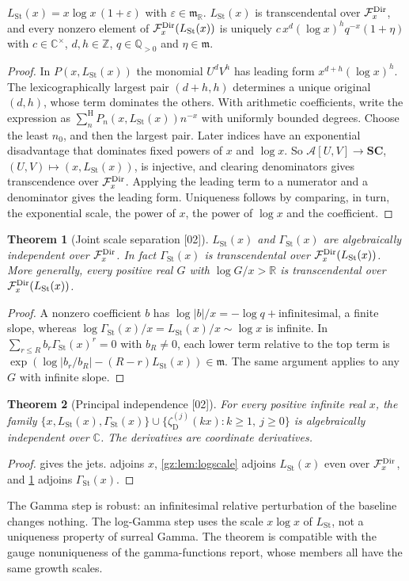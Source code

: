 \documentclass[11pt,a4paper]{article}
\numberwithin{equation}{section}
\newtheorem{theorem}{Theorem}[section]
\theoremstyle{definition}
\theoremstyle{remark}
\newcommand{\SC}{\mathbf{SC}}
\newcommand{\R}{\mathbb R}
\newcommand{\C}{\mathbb C}
\newcommand{\Q}{\mathbb Q}
\newcommand{\Z}{\mathbb Z}
\newcommand{\mm}{\mathfrak m}
\newcommand{\eps}{\varepsilon}
\newcommand{\Sh}{\mathop{\textstyle\sum}\nolimits^{\mathrm H}}
\newcommand{\LSt}{L_{\mathrm{St}}}
\newcommand{\GSt}{\Gamma_{\mathrm{St}}}
\newcommand{\zD}{\zeta_{\mathrm D}}
\newcommand{\Arith}{\mathcal A}
\newcommand{\src}[1]{\textup{[#1]}}
\begin{document}
\begin{lemma}[A logarithmic scale \src{02}]\label{gz:lem:logscale}
$\LSt(x)=x\log x\,(1+\eps)$ with $\eps\in\mm_\R$. $\LSt(x)$ is transcendental
over $\mathcal F_x^{\rm Dir}$, and every nonzero element of
$\mathcal F_x^{\rm Dir}(\LSt(x))$ is uniquely
$c\,x^d(\log x)^hq^{-x}(1+\eta)$ with $c\in\C^\times$, $d,h\in\Z$,
$q\in\Q_{>0}$ and $\eta\in\mm$.
\end{lemma}
\begin{proof}
In $P(x,\LSt(x))$ the monomial $U^dV^h$ has leading form $x^{d+h}(\log x)^h$.
The lexicographically largest pair $(d+h,h)$ determines a unique original
$(d,h)$, whose term dominates the others. With arithmetic coefficients,
write the expression as $\Sh_nP_n(x,\LSt(x))n^{-x}$ with uniformly bounded
degrees. Choose the least $n_0$, and then the largest pair. Later indices
have an exponential disadvantage that dominates fixed powers of $x$ and
$\log x$. So $\Arith[U,V]\to\SC$, $(U,V)\mapsto(x,\LSt(x))$, is injective,
and clearing denominators gives transcendence over $\mathcal F_x^{\rm Dir}$.
Applying the leading term to a numerator and a denominator gives the
leading form. Uniqueness follows by comparing, in turn, the exponential
scale, the power of $x$, the power of $\log x$ and the coefficient.
\end{proof}

\begin{theorem}[Joint scale separation \src{02}]\label{gz:thm:joint}
$\LSt(x)$ and $\GSt(x)$ are algebraically independent over
$\mathcal F_x^{\rm Dir}$. In fact $\GSt(x)$ is transcendental over
$\mathcal F_x^{\rm Dir}(\LSt(x))$. More generally, every positive real $G$
with $\log G/x>\R$ is transcendental over $\mathcal F_x^{\rm Dir}(\LSt(x))$.
\end{theorem}
\begin{proof}
A nonzero coefficient $b$ has $\log|b|/x=-\log q+\text{infinitesimal}$, a
finite slope, whereas $\log\GSt(x)/x=\LSt(x)/x\sim\log x$ is infinite. In
$\sum_{r\le R}b_r\GSt(x)^r=0$ with $b_R\ne0$, each lower term relative to
the top term is $\exp(\log|b_r/b_R|-(R-r)\LSt(x))\in\mm$. The same argument
applies to any $G$ with infinite slope.
\end{proof}

\begin{theorem}[Principal independence \src{02}]\label{gz:thm:indep-main}
For every positive infinite real $x$, the family
$\{x,\LSt(x),\GSt(x)\}\cup\{\zD^{(j)}(kx):k\ge1,\ j\ge0\}$ is algebraically
independent over $\C$. The derivatives are coordinate derivatives.
\end{theorem}
\begin{proof}
 gives the jets.  adjoins
$x$, \cref{gz:lem:logscale} adjoins $\LSt(x)$ even over $\mathcal F_x^{\rm Dir}$,
and \cref{gz:thm:joint} adjoins $\GSt(x)$.
\end{proof}
The Gamma step is robust: an infinitesimal relative perturbation of the
baseline changes nothing. The log-Gamma step uses the scale $x\log x$ of
$\LSt$, not a uniqueness property of surreal Gamma. The theorem is
compatible with the gauge nonuniqueness of the gamma-functions report, whose
members all have the same growth scales.
\end{document}
